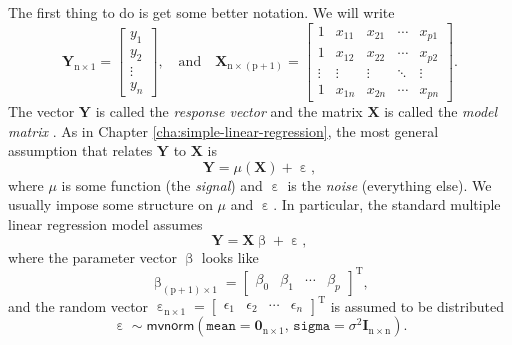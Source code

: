 \documentclass[captions=tableheading]{scrbook}
\begin{document}
\label{sec:The-MLR-Model}

The first thing to do is get some better notation. We will write 
\begin{equation}
\mathbf{Y}_{\mathrm{n}\times1}=
\begin{bmatrix}y_{1}\\
y_{2}\\
\vdots\\
y_{n}
\end{bmatrix},
\quad\mbox{and}\quad\mathbf{X}_{\mathrm{n}\times(\mathrm{p}+1)}=
\begin{bmatrix}1 & x_{11} & x_{21} & \cdots & x_{p1}\\
1 & x_{12} & x_{22} & \cdots & x_{p2}\\
\vdots & \vdots & \vdots & \ddots & \vdots\\
1 & x_{1n} & x_{2n} & \cdots & x_{pn}
\end{bmatrix}.
\end{equation}
The vector \(\mathbf{Y}\) is called the \emph{response vector}  and the matrix \(\mathbf{X}\) is called the \emph{model matrix} . As in Chapter \ref{cha:simple-linear-regression}, the most general assumption that relates \(\mathbf{Y}\) to \(\mathbf{X}\) is
\begin{equation}
\mathbf{Y}=\mu(\mathbf{X})+\upepsilon,
\end{equation}
where \(\mu\) is some function (the \emph{signal}) and \(\upepsilon\) is the \emph{noise} (everything else). We usually impose some structure on \(\mu\) and \(\upepsilon\). In particular, the standard multiple linear regression model assumes
\begin{equation}
\mathbf{Y}=\mathbf{X}\upbeta+\upepsilon,
\end{equation}
where the parameter vector \(\upbeta\) looks like 
\begin{equation}
\upbeta_{(\mathrm{p}+1)\times1}=\begin{bmatrix}\beta_{0} & \beta_{1} & \cdots & \beta_{p}\end{bmatrix}^{\mathrm{T}},
\end{equation}
and the random vector \(\upepsilon_{\mathrm{n}\times1}=\begin{bmatrix}\epsilon_{1} & \epsilon_{2} & \cdots & \epsilon_{n}\end{bmatrix}^{\mathrm{T}}\) is assumed to be distributed
\begin{equation}
\upepsilon\sim\mathsf{mvnorm}\left(\mathtt{mean}=\mathbf{0}_{\mathrm{n}\times1},\,\mathtt{sigma}=\sigma^{2}\mathbf{I}_{\mathrm{n}\times\mathrm{n}}\right).
\end{equation}
\end{document}
